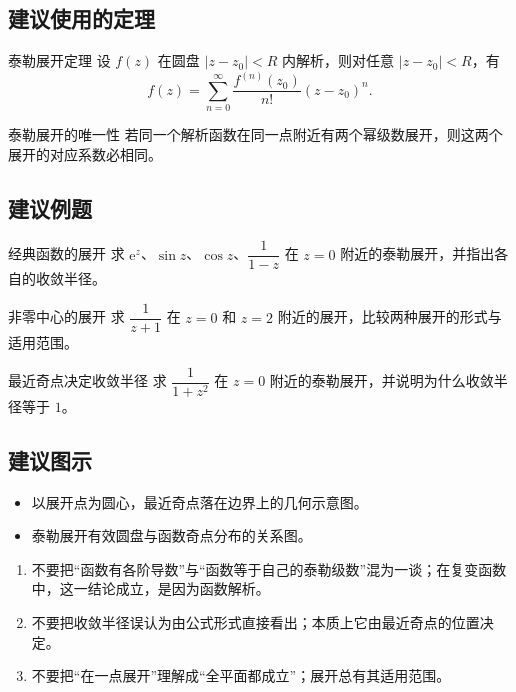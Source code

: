 \subsection*{建议使用的定理}
\begin{dingli}{泰勒展开定理}{}
设 $f(z)$ 在圆盘 $|z-z_0|<R$ 内解析，则对任意 $|z-z_0|<R$，有
\[
    f(z) = \sum_{n=0}^{\infty} \frac{f^{(n)}(z_0)}{n!}(z-z_0)^n.
\]
\end{dingli}

\begin{dingli}{泰勒展开的唯一性}{}
若同一个解析函数在同一点附近有两个幂级数展开，则这两个展开的对应系数必相同。
\end{dingli}

\subsection*{建议例题}
\begin{lizi}{经典函数的展开}{}
求 $\mathrm{e}^z$、$\sin z$、$\cos z$、$\dfrac{1}{1-z}$ 在 $z=0$ 附近的泰勒展开，并指出各自的收敛半径。
\end{lizi}

\begin{lizi}{非零中心的展开}{}
求 $\dfrac{1}{z+1}$ 在 $z=0$ 和 $z=2$ 附近的展开，比较两种展开的形式与适用范围。
\end{lizi}

\begin{lizi}{最近奇点决定收敛半径}{}
求 $\dfrac{1}{1+z^2}$ 在 $z=0$ 附近的泰勒展开，并说明为什么收敛半径等于 $1$。
\end{lizi}

\subsection*{建议图示}
\begin{itemize}
    \item 以展开点为圆心，最近奇点落在边界上的几何示意图。
    \item 泰勒展开有效圆盘与函数奇点分布的关系图。
\end{itemize}

\begin{jinshi}[本节易错点]
\begin{enumerate}
    \item 不要把``函数有各阶导数''与``函数等于自己的泰勒级数''混为一谈；在复变函数中，这一结论成立，是因为函数解析。
    \item 不要把收敛半径误认为由公式形式直接看出；本质上它由最近奇点的位置决定。
    \item 不要把``在一点展开''理解成``全平面都成立''；展开总有其适用范围。
\end{enumerate}
\end{jinshi}

